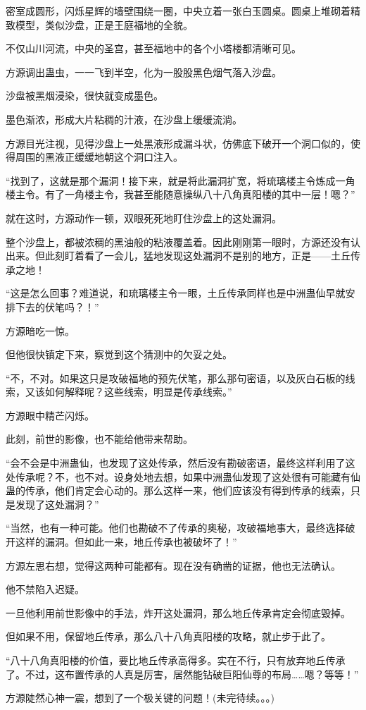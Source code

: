 \begin{this_body}
密室成圆形，闪烁星辉的墙壁围绕一圈，中央立着一张白玉圆桌。圆桌上堆砌着精致模型，类似沙盘，正是王庭福地的全貌。

不仅山川河流，中央的圣宫，甚至福地中的各个小塔楼都清晰可见。

方源调出蛊虫，一一飞到半空，化为一股股黑色烟气落入沙盘。

沙盘被黑烟浸染，很快就变成墨色。

墨色渐浓，形成大片粘稠的汁液，在沙盘上缓缓流淌。

方源目光注视，见得沙盘上一处黑液形成漏斗状，仿佛底下破开一个洞口似的，使得周围的黑液正缓缓地朝这个洞口注入。

“找到了，这就是那个漏洞！接下来，就是将此漏洞扩宽，将琉璃楼主令炼成一角楼主令。有了一角楼主令，我甚至能随意操纵八十八角真阳楼的其中一层！嗯？”

就在这时，方源动作一顿，双眼死死地盯住沙盘上的这处漏洞。

整个沙盘上，都被浓稠的黑油般的粘液覆盖着。因此刚刚第一眼时，方源还没有认出来。但此刻盯着看了一会儿，猛地发现这处漏洞不是别的地方，正是——土丘传承之地！

“这是怎么回事？难道说，和琉璃楼主令一眼，土丘传承同样也是中洲蛊仙早就安排下去的伏笔吗？！”

方源暗吃一惊。

但他很快镇定下来，察觉到这个猜测中的欠妥之处。

“不，不对。如果这只是攻破福地的预先伏笔，那么那句密语，以及灰白石板的线索，又该如何解释呢？这些线索，明显是传承线索。”

方源眼中精芒闪烁。

此刻，前世的影像，也不能给他带来帮助。

“会不会是中洲蛊仙，也发现了这处传承，然后没有勘破密语，最终这样利用了这处传承呢？不，也不对。设身处地去想，如果中洲蛊仙发现了这处很有可能藏有仙蛊的传承，他们肯定会心动的。那么这样一来，他们应该没有得到传承的线索，只是发现了这处漏洞？”

“当然，也有一种可能。他们也勘破不了传承的奥秘，攻破福地事大，最终选择破开这样的漏洞。但如此一来，地丘传承也被破坏了！”

方源左思右想，觉得这两种可能都有。现在没有确凿的证据，他也无法确认。

他不禁陷入迟疑。

一旦他利用前世影像中的手法，炸开这处漏洞，那么地丘传承肯定会彻底毁掉。

但如果不用，保留地丘传承，那么八十八角真阳楼的攻略，就止步于此了。

“八十八角真阳楼的价值，要比地丘传承高得多。实在不行，只有放弃地丘传承了。不过，这布置传承的人真是厉害，居然能钻破巨阳仙尊的布局……嗯？等等！”

方源陡然心神一震，想到了一个极关键的问题！(未完待续。。。)

\end{this_body}

